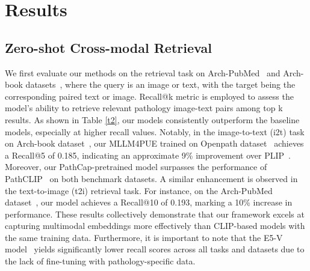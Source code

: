 \section{Results}
\subsection{Zero-shot Cross-modal Retrieval}
We first evaluate our methods on the retrieval task on Arch-PubMed~\cite{gamper2021multiple} and Arch-book datasets~\cite{gamper2021multiple}, where the query is an image or text, with the target being the corresponding paired text or image. Recall@k metric is employed to assess the model's ability to retrieve relevant pathology image-text pairs among top k results. As shown in Table \ref{t2}, our models consistently outperform the baseline models, especially at higher recall values. Notably, in the image-to-text (i2t) task on Arch-book dataset~\cite{gamper2021multiple}, our MLLM4PUE trained on Openpath dataset~\cite{huang2023visual} achieves a Recall@5 of 0.185, indicating an approximate 9\% improvement over PLIP~\cite{huang2023visual}. Moreover, our PathCap-pretrained model surpasses the performance of PathCLIP~\cite{sun2024pathasst} on both benchmark datasets. A similar enhancement is observed in the text-to-image (t2i) retrieval task. For instance, on the Arch-PubMed dataset~\cite{gamper2021multiple}, our model achieves a Recall@10 of 0.193, marking a 10\% increase in performance. These results collectively demonstrate that our framework excels at capturing multimodal embeddings more effectively than CLIP-based models with the same training data. Furthermore, it is important to note that the E5-V model~\cite{jiang2024e5} yields significantly lower recall scores across all tasks and datasets due to the lack of fine-tuning with pathology-specific data.

